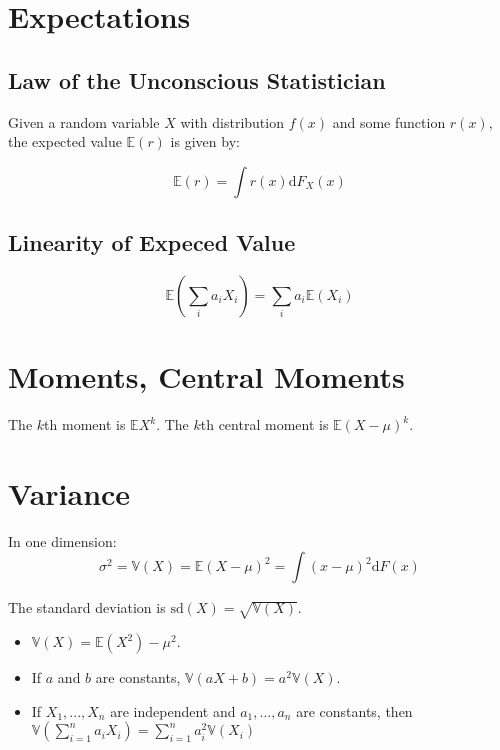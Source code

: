 \section{Expectations}

\subsection{Law of the Unconscious Statistician}
Given a random variable $X$ with distribution $f(x)$ and some function $r(x)$, the expected value $\mathbb{E}(r)$ is given by:

\begin{equation}
\mathbb{E}(r) = \int r(x) \mathrm{d}F_X(x)
\end{equation}

\subsection{Linearity of Expeced Value}
\begin{equation}
\mathbb{E}\left(\sum_i a_i X_i \right) = \sum_i a_i \mathbb{E}(X_i)
\end{equation}

\section{Moments, Central Moments}

The $k$th moment is $\mathbb{E}X^k$. The $k$th central moment is $\mathbb{E}(X-\mu)^k$.


\section{Variance}

In one dimension:
\begin{equation}
\sigma^2 =\mathbb{V}(X) = \mathbb{E}(X-\mu)^2 = \int (x-\mu)^2 \mathrm{d}F(x)
\end{equation}

The standard deviation is $\mathrm{sd}(X) = \sqrt{\mathbb{V}(X)}$. 

\begin{itemize}
\item $\mathbb{V}(X) = \mathbb{E}(X^2) - \mu^2$.
\item If $a$ and $b$ are constants, $\mathbb{V}(aX+b) = a^2 \mathbb{V}(X)$.
\item If $X_1,...,X_n$ are independent and $a_1,...,a_n$ are constants, then $\mathbb{V}\left(\sum^n_{i=1}a_i X_i\right) = \sum_{i=1}^n a_i^2 \mathbb{V}(X_i)$
\end{itemize}


